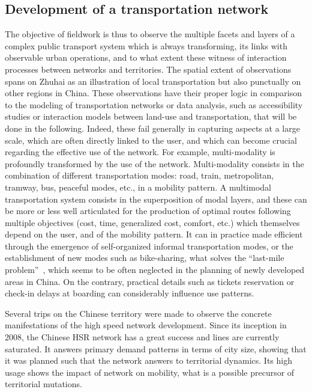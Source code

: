 \documentclass[11pt]{article}
\begin{document}
\subsection{Development of a transportation network}

The objective of fieldwork is thus to observe the multiple facets and layers of a complex public transport system which is always transforming, its links with observable urban operations, and to what extent these witness of interaction processes between networks and territories. The spatial extent of observations spans on Zhuhai as an illustration of local transportation but also punctually on other regions in China. These observations have their proper logic in comparison to the modeling of transportation networks or data analysis, such as accessibility studies or interaction models between land-use and transportation, that will be done in the following. Indeed, these fail generally in capturing aspects at a large scale, which are often directly linked to the user, and which can become crucial regarding the effective use of the network. For example, multi-modality is profoundly transformed by the use of the network. Multi-modality consists in the combination of different transportation modes: road, train, metropolitan, tramway, bus, peaceful modes, etc., in a mobility pattern. A multimodal transportation system consists in the superposition of modal layers, and these can be more or less well articulated for the production of optimal routes following multiple objectives (cost, time, generalized cost, comfort, etc.) which themselves depend on the user, and of the mobility pattern. It can in practice made efficient through the emergence of self-organized informal transportation modes, or the establishment of new modes such as bike-sharing, what solves the ``last-mile problem''~\citep{liu2012solving}, which seems to be often neglected in the planning of newly developed areas in China. On the contrary, practical details such as tickets reservation or check-in delays at boarding can considerably influence use patterns.


Several trips on the Chinese territory were made to observe the concrete manifestations of the high speed network development. Since its inception in 2008, the Chinese HSR network has a great success and lines are currently saturated. It answers primary demand patterns in terms of city size, showing that it was planned such that the network answers to territorial dynamics. Its high usage shows the impact of network on mobility, what is a possible precursor of territorial mutations.
\end{document}
